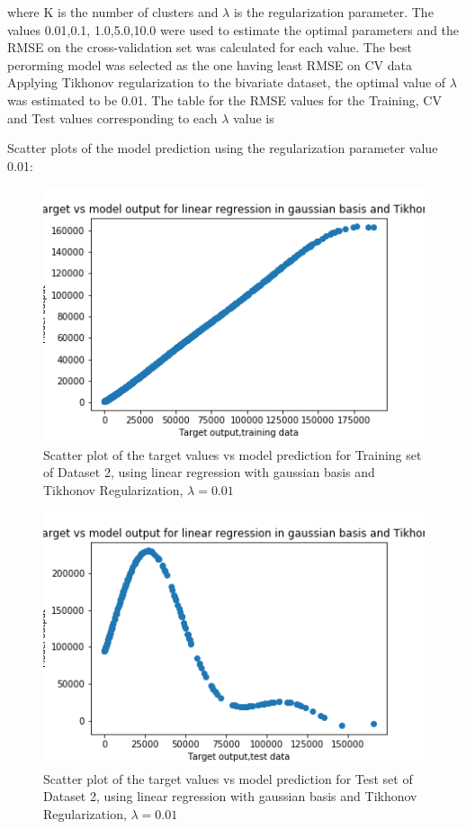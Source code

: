 \documentclass[12pt,a4paper]{article}
\newcommand{\noi}{\noindent}
\begin{document}
where K is the number of clusters and $\lambda$ is the regularization parameter. The values 0.01,0.1, 1.0,5.0,10.0 were used to estimate the optimal parameters and the RMSE on the cross-validation set was calculated for each value. The best perorming model was selected as the one having least RMSE on CV data\\ 
Applying Tikhonov regularization to the bivariate dataset, the optimal value of $\lambda$ was estimated to be 0.01. 
 The table for the RMSE values for the Training, CV and Test values corresponding to each $\lambda$ value is


\noi
Scatter plots of the model prediction using the regularization parameter value 0.01:
\begin{figure}[H]
     \centering
     \includegraphics[scale=0.5]{images/scatter_ds2tikhtr.png}
     \caption{Scatter plot of the target values vs model prediction for Training set of Dataset 2, using linear regression with gaussian basis and Tikhonov Regularization, $\lambda = 0.01 $}
     \label{fig:tikhds2tr}
\end{figure}
\begin{figure}[H]
     \centering
     \includegraphics[scale=0.5]{images/scatter_ds2tikhtest.png}
     \caption{Scatter plot of the target values vs model prediction for Test set of Dataset 2, using linear regression with gaussian basis and Tikhonov Regularization, $\lambda = 0.01 $}
     \label{fig:tikhds2tr}
\end{figure}
\end{document}
